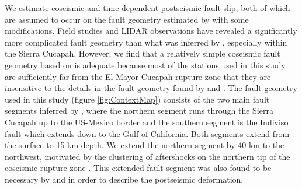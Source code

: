 \documentclass[1p]{elsarticle}
\begin{document}
We estimate coseismic and time-dependent postseismic fault slip, both of which are assumed to occur on the fault geometry estimated by \citet{Wei2011} with some modifications.  Field studies \citep{Fletcher2014} and LIDAR observations \citep{Oskin2012} have revealed a significantly more complicated fault geometry than what was inferred by \citet{Wei2011}, especially within the Sierra Cucapah.  However, we find that a relatively simple coseismic fault geometry based on \citep{Wei2011} is adequate because most of the stations used in this study are sufficiently far from the El Mayor-Cucapah rupture zone that they are insensitive to the details in the fault geometry found by \citet{Fletcher2014} and \citet{Oskin2012}.  The fault geometry used in this study (figure \ref{fig:ContextMap}) consists of the two main fault segments inferred by \citet{Wei2011}, where the northern segment runs through the Sierra Cucapah up to the US-Mexico border and the southern segment is the Indiviso fault which extends down to the Gulf of California. Both segments extend from the surface to 15 km depth.  We extend the northern segment by 40 km to the northwest, motivated by the clustering of aftershocks on the northern tip of the coseismic rupture zone \citep{Hauksson2011,Kroll2013}.  This extended fault segment was also found to be necessary by \citet{Rollins2015} and \citet{Pollitz2012} in order to describe the postseismic deformation. 

\end{document}
